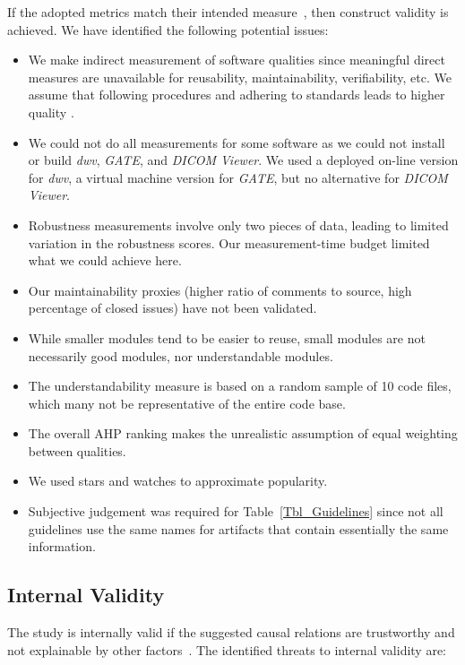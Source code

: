 \documentclass[draft, 12pt, 3p, times]{elsarticle} %
\begin{document}
If the adopted metrics match their intended measure~\cite{RunesonAndHost2009},
then construct validity is achieved. We have identified the following potential
issues:
\begin{itemize}
\item We make indirect measurement of software qualities since meaningful direct
measures are unavailable for reusability, maintainability, verifiability, etc.
We assume that following procedures and adhering to standards leads to higher
quality \cite[p.\ 112]{VanVliet2000}.
\item We could not do all measurements for some software as we could not
install or build \textit{dwv}, \textit{GATE}, and \textit{DICOM Viewer}. We
used a deployed on-line version for \textit{dwv}, a virtual machine version for
\textit{GATE}, but no alternative for \textit{DICOM Viewer}.
\item Robustness measurements involve only two pieces of data, leading to
limited variation in the robustness scores. Our measurement-time budget limited
what we could achieve here.
\item Our maintainability proxies (higher ratio of comments to source,
high percentage of closed issues) have not been validated.
\item While smaller modules tend to be easier to reuse, small modules are
not necessarily good modules, nor understandable modules.
\item The understandability measure is based on a random sample of 10 code
files, which many not be representative of the entire code base. 
\item The overall AHP ranking makes the unrealistic assumption of equal
weighting between qualities.
\item We used stars and watches to approximate popularity.
\item Subjective judgement was required for Table~\ref{Tbl_Guidelines} since not
all guidelines use the same names for artifacts that contain essentially the
same information.
\end{itemize}

\subsection{Internal Validity} \label{Sec_InternalValidity}

The study is internally valid if the suggested causal relations are trustworthy
and not explainable by other factors~\cite{RunesonAndHost2009}. The identified
threats to internal validity are:
\end{document}
